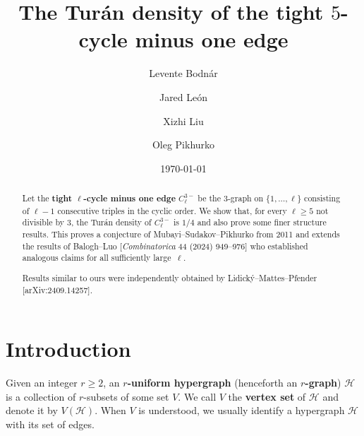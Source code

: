 \documentclass[11pt,a4paper]{article}
\theoremstyle{remark}
\newcommand{\C}[1]{\mathcal{#1}}
\begin{document}
\title{\bf\Large The Tur\'{a}n density of the tight $5$-cycle minus one edge}
\author{Levente Bodn\'ar}
\author{Jared Le\'on}
\author{Xizhi Liu}
\author{Oleg Pikhurko}
\date{\today}
\maketitle
\begin{abstract}
Let the \textbf{tight $\ell$-cycle minus one edge} $C_\ell^{3-}$ be the $3$-graph on $\{1,\dots,\ell\}$ consisting of $\ell-1$ consecutive triples in the cyclic order. 
We show that, for every $\ell\ge 5$ not divisible by $3$, the  Tur\'{a}n density of $C_{\ell}^{3-}$ is $1/4$ and also prove some finer structure results. This proves a conjecture of Mubayi--Sudakov--Pikhurko from 2011 and extends the results of Balogh--Luo [\emph{Combinatorica} 44 (2024) 949–976] who established analogous claims for all sufficiently large~$\ell$.

Results similar to ours were independently obtained by Lidick\'y--Mattes--Pfender [arXiv:2409.14257].
\end{abstract}

\section{Introduction}\label{SEC:Intorduction}

Given an integer $r\ge 2$, an \textbf{$r$-uniform hypergraph} (henceforth an \textbf{$r$-graph}) $\mathcal{H}$ is a collection of $r$-subsets of some set $V$. We call $V$ the \textbf{vertex set} of $\C H$ and denote it by $V(\C H)$. When $V$ is understood, we usually identify a hypergraph $\mathcal{H}$ with its set of edges. %
\end{document}
